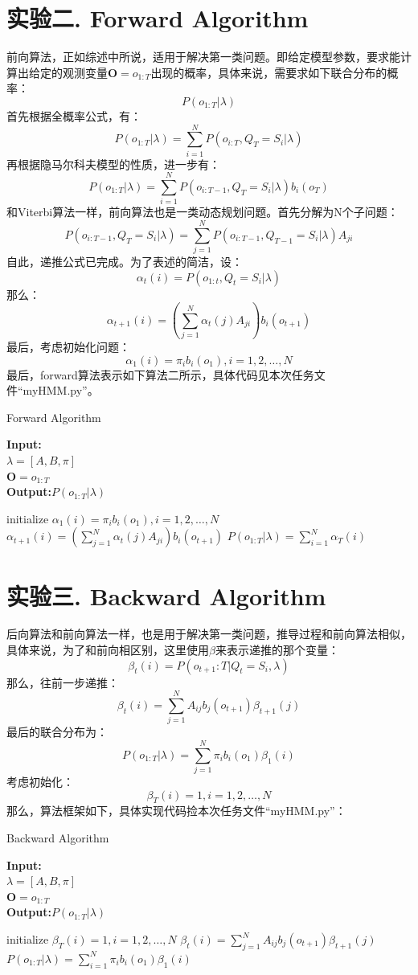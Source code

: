 \documentclass[a4paper,UTF8]{article}
\theoremstyle{definition}
\begin{document}
\section*{实验二. Forward Algorithm}
前向算法，正如综述中所说，适用于解决第一类问题。即给定模型参数，要求能计算出给定的观测变量$\bm O=o_{1:T}$出现的概率，具体来说，需要求如下联合分布的概率：
\[
P(o_{1:T}|\lambda)
\]
首先根据全概率公式，有：
\[
P(o_{1:T}|\lambda)=\sum^N_{i=1}P(o_{i:T},Q_T=S_i|\lambda)
\]
再根据隐马尔科夫模型的性质，进一步有：
\[
P(o_{1:T}|\lambda)=\sum^N_{i=1}P(o_{i:T-1},Q_T=S_i|\lambda)b_i(o_T)
\]
和Viterbi算法一样，前向算法也是一类动态规划问题。首先分解为N个子问题：
\[
P(o_{i:T-1},Q_T=S_i|\lambda)=\sum_{j=1}^NP(o_{i:T-1},Q_{T-1}=S_i|\lambda)A_{ji}
\]
自此，递推公式已完成。为了表述的简洁，设：
\[
\alpha_t(i)=P(o_{1:t},Q_t = S_i|\lambda)
\]
那么：
\[
\alpha_{t+1}(i)=(\sum_{j=1}^N\alpha_t(j)A_{ji})b_i(o_{t+1})
\]
最后，考虑初始化问题：
\[
\alpha_1(i)=\pi_ib_i(o_1), i = 1,2,\dots,N
\]
最后，forward算法表示如下算法二所示，具体代码见本次任务文件“myHMM.py”。
\begin{algorithm}
\caption{Forward Algorithm}
\textbf{Input:}\\ 
$\lambda=[A,B,\pi]$\\
$\bm O = o_{1:T}$\\
\textbf{Output:}$P(o_{1:T}|\lambda)$

\begin{algorithmic}[1]
\STATE initialize $\alpha_1(i)=\pi_ib_i(o_1), i = 1,2,\dots,N$
\STATE $\alpha_{t+1}(i)=(\sum_{j=1}^N\alpha_t(j)A_{ji})b_i(o_{t+1})$
\ENDFOR
\STATE $P(o_{1:T}|\lambda)=\sum^N_{i=1}\alpha_T(i)$
\end{algorithmic}
\end{algorithm}
\section*{实验三. Backward Algorithm}
后向算法和前向算法一样，也是用于解决第一类问题，推导过程和前向算法相似，具体来说，为了和前向相区别，这里使用$\beta$来表示递推的那个变量：
\[
\beta_t(i)=P(o_{t+1}:T|Q_t=S_i,\lambda)
\]
那么，往前一步递推：
\[
\beta_t(i) = \sum_{j=1}^NA_{ij}b_j(o_{t+1})\beta_{t+1}(j)
\]
最后的联合分布为：
\[
P(o_{1:T}|\lambda)=\sum_{j=1}^N\pi_ib_i(o_1)\beta_1(i)
\]
考虑初始化：
\[
\beta_T(i) = 1, i = 1,2,\dots,N
\]
那么，算法框架如下，具体实现代码捡本次任务文件“myHMM.py”：
\begin{algorithm}
\caption{Backward Algorithm}
\textbf{Input:}\\ 
$\lambda=[A,B,\pi]$\\
$\bm O = o_{1:T}$\\
\textbf{Output:}$P(o_{1:T}|\lambda)$

\begin{algorithmic}[1]
\STATE initialize $\beta_T(i) = 1, i = 1,2,\dots,N$
\STATE $\beta_t(i) = \sum_{j=1}^NA_{ij}b_j(o_{t+1})\beta_{t+1}(j)$
\ENDFOR
\STATE $P(o_{1:T}|\lambda)=\sum^N_{i=1}\pi_ib_i(o_1)\beta_1(i)$
\end{algorithmic}
\end{algorithm}
\end{document}
